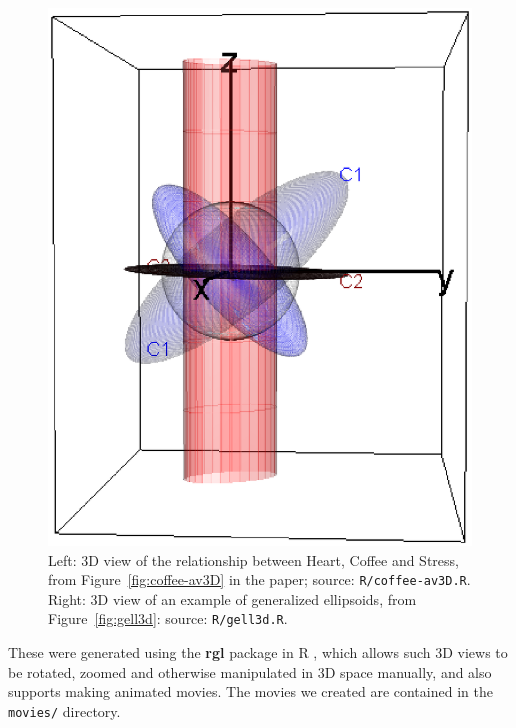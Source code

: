 \documentclass[11pt]{article}%
\newcommand*{\figref}[1]{Figure~\ref{#1}}
\newcommand*{\pkg}[1]{\textbf{#1}}     %
\newcommand*{\file}[1]{\texttt{#1}}     %
\begin{document}
\begin{figure}[htb]
\begin{minipage}[b]{.49\linewidth}
  \includegraphics[width=1\linewidth]{fig/gell3d-4}
 \end{minipage}
  \caption{Left: 3D view of the relationship between Heart, Coffee and Stress, from \figref{fig:coffee-av3D} in the paper; source: \file{R/coffee-av3D.R}.
  Right: 3D view of an example of generalized ellipsoids, from \figref{fig:gell3d}: source: \file{R/gell3d.R}.  
  }
  \label{fig:supp3D}
\end{figure}

These were generated using the \pkg{rgl} package in R \citep{rgl}, 
which allows such 3D views to be rotated, zoomed
and otherwise manipulated in 3D space manually, and also supports making animated movies. The movies we created
are contained in the \file{movies/} directory.

% 
% 
% 
% 

%
\end{document}
